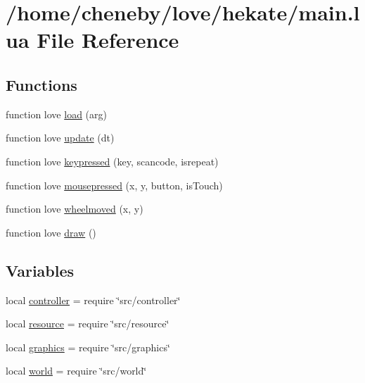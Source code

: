 \hypertarget{main_8lua}{\section{/home/cheneby/love/hekate/main.lua File Reference}
\label{main_8lua}
}
\subsection*{Functions}
\begin{DoxyCompactItemize}
\item 
function love \hyperlink{main_8lua_adf8b496c67ab1029834b4ddb0b144e63}{load} (arg)
\item 
function love \hyperlink{main_8lua_a4ef3dee71293b7bb452acb0e2cb14640}{update} (dt)
\item 
function love \hyperlink{main_8lua_ae913fc5d9124d1416bb69d80b26d2afe}{keypressed} (key, scancode, isrepeat)
\item 
function love \hyperlink{main_8lua_ae7088b0e1e0b7104990aa53e5ebb2aa9}{mousepressed} (x, y, button, is\-Touch)
\item 
function love \hyperlink{main_8lua_a75c448b1a3302e5867a1da4646accefe}{wheelmoved} (x, y)
\item 
function love \hyperlink{main_8lua_ab5178365eb0d4b473ec78416162375e5}{draw} ()
\end{DoxyCompactItemize}
\subsection*{Variables}
\begin{DoxyCompactItemize}
\item 
local \hyperlink{main_8lua_a42ca47a193e6b84d402c2a9fab0a69f1}{controller} = require \char`\"{}src/controller\char`\"{}
\item 
local \hyperlink{main_8lua_a24ad487107aaa56bef35825abbe9773d}{resource} = require \char`\"{}src/resource\char`\"{}
\item 
local \hyperlink{main_8lua_aae06ace8bee01f93d02dfaa4436de916}{graphics} = require \char`\"{}src/graphics\char`\"{}
\item 
local \hyperlink{main_8lua_a054520f514ab0d9a9b0fede5a23db9f7}{world} = require \char`\"{}src/world\char`\"{}
\end{DoxyCompactItemize}


